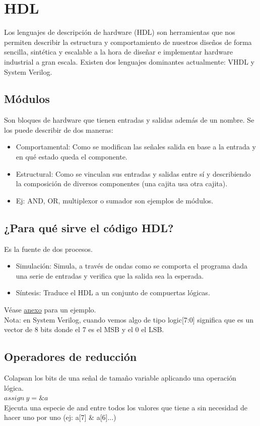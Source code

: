 \documentclass[10pt,a4paper]{article}
\begin{document}
\section*{HDL}
Los lenguajes de descripción de hardware (HDL) son herramientas que nos permiten describir la estructura y comportamiento de nuestros diseños de forma sencilla, sintética y escalable a la hora de diseñar e implementar hardware industrial a gran escala.
Existen dos lenguajes dominantes actualmente: VHDL y System Verilog. 
\subsection*{Módulos}
Son bloques de hardware que tienen entradas y salidas además de un nombre. Se los puede describir de dos maneras:
\begin{itemize}
    \item Comportamental: Como se modifican las señales salida en base a la entrada y en qué estado queda el componente.
    \item Estructural: Como se vinculan sus entradas y salidas entre sí y describiendo la composición de diversos componentes (una cajita usa otra cajita).
    \item Ej: AND, OR, multiplexor o sumador son ejemplos de módulos.
\end{itemize}
\subsection*{¿Para qué sirve el código HDL?}
Es la fuente de dos procesos.
\begin{itemize}
    \item Simulación: Simula, a través de ondas como se comporta el programa dada una serie de entradas y verifica que la salida sea la esperada.
    \item Síntesis: Traduce el HDL a un conjunto de compuertas lógicas.
\end{itemize}
Véase \hyperref[subsec:SVL_S_S]{anexo} para un ejemplo. \\ 
Nota: en System Verilog, cuando vemos algo de tipo logic[7:0] significa que es un vector de 8 bits donde el 7 es el MSB y el 0 el LSB.
\subsection*{Operadores de reducción}
Colapsan los bits de una señal de tamaño variable aplicando una operación lógica. \\
$assign \ y = \&a$ \\
Ejecuta una especie de and entre todos los valores que tiene a sin necesidad de hacer uno por uno (ej: a[7] \& a[6]...) \\
\end{document}

